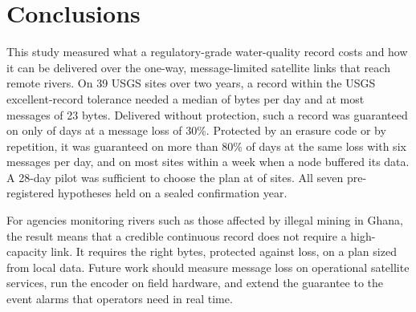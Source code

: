 \section{Conclusions}
\label{sec:conclusion}

This study measured what a regulatory-grade water-quality record costs and how it can be delivered over the one-way, message-limited satellite links that reach remote rivers. On 39 USGS sites over two years, a record within the USGS excellent-record tolerance needed a median of \needMedConf{} bytes per day and at most \needMsgMaxConf{} messages of 23 bytes. Delivered without protection, such a record was guaranteed on only \gRelIndPct{} of days at a message loss of 30\%. Protected by an erasure code or by repetition, it was guaranteed on more than 80\% of days at the same loss with six messages per day, and on most sites within a week when a node buffered its data. A 28-day pilot was sufficient to choose the plan at \sizeSuff{} of sites. All seven pre-registered hypotheses held on a sealed confirmation year.

For agencies monitoring rivers such as those affected by illegal mining in Ghana, the result means that a credible continuous record does not require a high-capacity link. It requires the right bytes, protected against loss, on a plan sized from local data. Future work should measure message loss on operational satellite services, run the encoder on field hardware, and extend the guarantee to the event alarms that operators need in real time.

